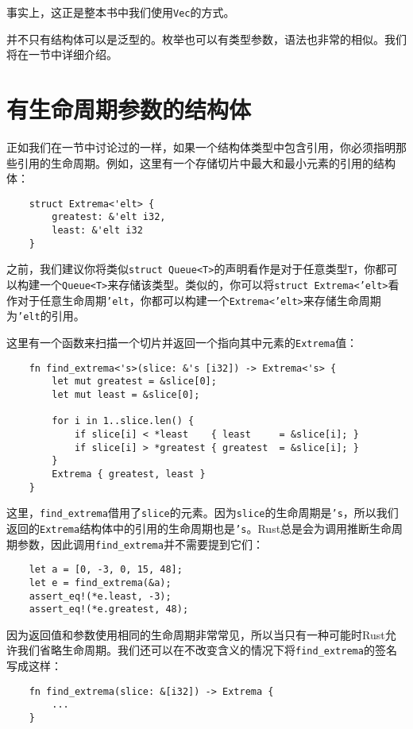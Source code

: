 事实上，这正是整本书中我们使用\texttt{Vec}的方式。

并不只有结构体可以是泛型的。枚举也可以有类型参数，语法也非常的相似。我们将在一节中详细介绍。

\section{有生命周期参数的结构体}

正如我们在一节中讨论过的一样，如果一个结构体类型中包含引用，你必须指明那些引用的生命周期。例如，这里有一个存储切片中最大和最小元素的引用的结构体：
\begin{verbatim}
    struct Extrema<'elt> {
        greatest: &'elt i32,
        least: &'elt i32
    }
\end{verbatim}

之前，我们建议你将类似\texttt{struct Queue<T>}的声明看作是对于任意类型\texttt{T}，你都可以构建一个\texttt{Queue<T>}来存储该类型。类似的，你可以将\texttt{struct Extrema<'elt>}看作对于任意生命周期\texttt{'elt}，你都可以构建一个\texttt{Extrema<'elt>}来存储生命周期为\texttt{'elt}的引用。

这里有一个函数来扫描一个切片并返回一个指向其中元素的\texttt{Extrema}值：
\begin{verbatim}
    fn find_extrema<'s>(slice: &'s [i32]) -> Extrema<'s> {
        let mut greatest = &slice[0];
        let mut least = &slice[0];

        for i in 1..slice.len() {
            if slice[i] < *least    { least     = &slice[i]; }
            if slice[i] > *greatest { greatest  = &slice[i]; }
        }
        Extrema { greatest, least }
    }
\end{verbatim}

这里，\texttt{find\_extrema}借用了\texttt{slice}的元素。因为\texttt{slice}的生命周期是\texttt{'s}，所以我们返回的\texttt{Extrema}结构体中的引用的生命周期也是\texttt{'s}。Rust总是会为调用推断生命周期参数，因此调用\texttt{find\_extrema}并不需要提到它们：
\begin{verbatim}
    let a = [0, -3, 0, 15, 48];
    let e = find_extrema(&a);
    assert_eq!(*e.least, -3);
    assert_eq!(*e.greatest, 48);
\end{verbatim}

因为返回值和参数使用相同的生命周期非常常见，所以当只有一种可能时Rust允许我们省略生命周期。我们还可以在不改变含义的情况下将\texttt{find\_extrema}的签名写成这样：
\begin{verbatim}
    fn find_extrema(slice: &[i32]) -> Extrema {
        ...
    }
\end{verbatim}


